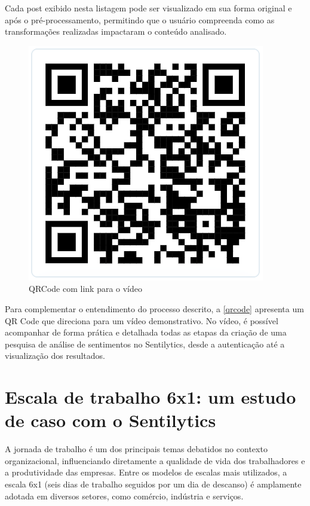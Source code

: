 \documentclass[
	12pt,				%
	oneside,			%
	a4paper,			%
	english,			%
	french,				%
	spanish,			%
	brazil				%
	]{abntex2}
\begin{document}
Cada post exibido nesta listagem pode ser visualizado em sua forma
original e após o pré-processamento, permitindo que o usuário compreenda
como as transformações realizadas impactaram o conteúdo analisado.

\begin{figure}[htbp]
\hypertarget{qrcode}{%
\caption{QRCode com link para o vídeo}\label{qrcode}
\begin{center}
\includegraphics[scale=0.6]{imagens/sentilytics/qr_code.png}
\end{center}
}
\end{figure}

Para complementar o entendimento do processo descrito, a
\autoref{qrcode} apresenta um QR Code que direciona para um vídeo
demonstrativo. No vídeo, é possível acompanhar de forma prática e
detalhada todas as etapas da criação de uma pesquisa de análise de
sentimentos no Sentilytics, desde a autenticação até a visualização dos
resultados.

\hypertarget{escala-de-trabalho-6x1-um-estudo-de-caso-com-o-sentilytics}{%
\chapter{Escala de trabalho 6x1: um estudo de caso com o
Sentilytics}\label{escala-de-trabalho-6x1-um-estudo-de-caso-com-o-sentilytics}}

A jornada de trabalho é um dos principais temas debatidos no contexto
organizacional, influenciando diretamente a qualidade de vida dos
trabalhadores e a produtividade das empresas. Entre os modelos de
escalas mais utilizados, a escala 6x1 (seis dias de trabalho seguidos
por um dia de descanso) é amplamente adotada em diversos setores, como
comércio, indústria e serviços.
\end{document}

